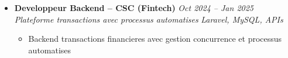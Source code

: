 \documentclass[a4paper,11pt]{article}
\begin{document}
\begin{itemize}[leftmargin=*, label={-}]
\item \textbf{Developpeur Backend -- CSC (Fintech)} \hfill \textit{Oct 2024 -- Jan 2025} \\
\textit{Plateforme transactions avec processus automatises} \hfill \textit{Laravel, MySQL, APIs}
\vspace{-2pt}
    \begin{itemize}[leftmargin=0.4cm, nosep, label=\tiny$\bullet$]
        \item \small{Backend transactions financieres avec gestion concurrence et processus automatises}
    \end{itemize}

\end{itemize}
\end{document}
